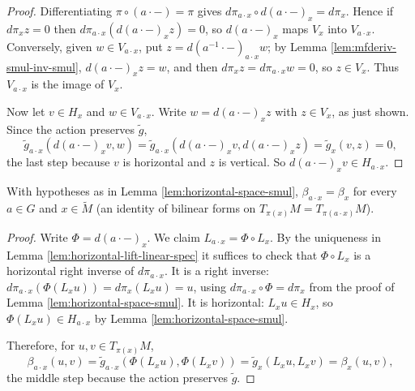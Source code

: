 \begin{proof}
\leanok
{}
Differentiating $\pi \circ (a \cdot {-}) = \pi$ gives $d\pi_{a \cdot x} \circ d(a \cdot {-})_x = d\pi_x$. Hence if $d\pi_x z = 0$ then $d\pi_{a\cdot x}(d(a\cdot{-})_x z) = 0$, so $d(a \cdot {-})_x$ maps $V_x$ into $V_{a \cdot x}$. Conversely, given $w \in V_{a \cdot x}$, put $z = d(a^{-1} \cdot {-})_{a \cdot x} w$; by Lemma \ref{lem:mfderiv-smul-inv-smul}, $d(a\cdot{-})_x z = w$, and then $d\pi_x z = d\pi_{a \cdot x} w = 0$, so $z \in V_x$. Thus $V_{a \cdot x}$ is the image of $V_x$.

Now let $v \in H_x$ and $w \in V_{a \cdot x}$. Write $w = d(a \cdot {-})_x z$ with $z \in V_x$, as just shown. Since the action preserves $\tilde{g}$,
\[
\tilde{g}_{a \cdot x}(d(a\cdot{-})_x v, w) = \tilde{g}_{a \cdot x}(d(a\cdot{-})_x v, d(a\cdot{-})_x z) = \tilde{g}_x(v,z) = 0,
\]
the last step because $v$ is horizontal and $z$ is vertical. So $d(a\cdot{-})_x v \in H_{a \cdot x}$.
\end{proof}

\begin{lemma}
\label{lem:submersion-inner-smul}
\leanok
{}
With hypotheses as in Lemma \ref{lem:horizontal-space-smul}, $\beta_{a \cdot x} = \beta_x$ for every $a \in G$ and $x \in \tilde{M}$ (an identity of bilinear forms on $T_{\pi(x)}M = T_{\pi(a \cdot x)}M$).
\end{lemma}

\begin{proof}
\leanok
{}
Write $\Phi = d(a \cdot {-})_x$. We claim $L_{a \cdot x} = \Phi \circ L_x$. By the uniqueness in Lemma \ref{lem:horizontal-lift-linear-spec} it suffices to check that $\Phi \circ L_x$ is a horizontal right inverse of $d\pi_{a \cdot x}$. It is a right inverse: $d\pi_{a \cdot x}(\Phi(L_x u)) = d\pi_x(L_x u) = u$, using $d\pi_{a \cdot x} \circ \Phi = d\pi_x$ from the proof of Lemma \ref{lem:horizontal-space-smul}. It is horizontal: $L_x u \in H_x$, so $\Phi(L_x u) \in H_{a \cdot x}$ by Lemma \ref{lem:horizontal-space-smul}.

Therefore, for $u,v \in T_{\pi(x)}M$,
\[
\beta_{a \cdot x}(u,v) = \tilde{g}_{a \cdot x}(\Phi(L_x u), \Phi(L_x v)) = \tilde{g}_x(L_x u, L_x v) = \beta_x(u,v),
\]
the middle step because the action preserves $\tilde{g}$.
\end{proof}

